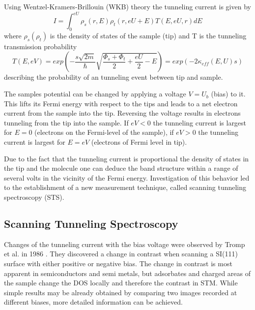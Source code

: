 Using  Wentzel-Kramers-Brillouin (WKB) theory\cite{wentzel_verallgemeinerung_1926, kramers_wellenmechanik_1926, brillouin_mecanique_1926} the tunneling current is given by
\begin{equation}
I=\int_0^{eU}\rho_s(r,E)\rho_t(r,eU+E)T(E,eU,r)dE
\label{WKB}
\end{equation}
where $\rho_s(\rho_t)$ is the density of states of the sample (tip) and T is the tunneling transmission probability
\begin{equation}
T(E,eV)=exp\left(-\frac{s\sqrt{2m}}{\hbar}\sqrt{\frac{\Phi_s+\Phi_t}{2}+\frac{eU}{2}-E}\right)=exp\left(-2\kappa_{eff}(E,U)s\right)
\label{Transmission-function} 
\end{equation}
describing the probability of an tunneling event between tip and sample.

The samples potential can be changed by applying a voltage $V=U_b$ (bias) to it. This lifts its Fermi energy with respect to the tips and leads to a net electron current from the sample into the tip. Reversing the voltage results in electrons tunneling from the tip into the sample. If $eV<0$ the tunneling current is largest for $E=0$ (electrons on the Fermi-level of the sample), if $eV>0$ the tunneling current is largest for $E=eV$ (electrons of Fermi level in tip).

Due to the fact that the tunneling current is proportional the density of states in the tip and the molecule one can deduce the band structure within a range of several volts in the vicinity of the Fermi energy. Investigation of this behavior led to the establishment of a new measurement technique, called scanning tunneling spectroscopy (STS).

\subsection{\textbf{S}canning \textbf{T}unneling \textbf{S}pectroscopy}
\label{section:STS}
Changes of the tunneling current with the bias voltage were observed by Tromp et al. in 1986 \cite{tromp_atomic_1986}. They discovered a change in contrast when scanning a SI(111) surface with either positive or negative bias. The change in contrast is most apparent in semiconductors and semi metals\cite{bonnell_scanning_1993}, but adsorbates and charged areas of the sample change the DOS locally and therefore the contrast in STM. While simple results may be already obtained by comparing two images recorded at different biases, more detailed information can be achieved.

